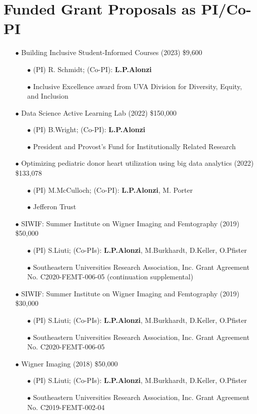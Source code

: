 \documentclass{article}[10pt]
\begin{document}
\section*{Funded Grant Proposals as PI/Co-PI}
\begin{itemize}
\item[$\bullet$] Building Inclusive Student-Informed Courses (2023) \$9,600
\begin{itemize}
\item[$\bullet$] (PI) R. Schmidt; (Co-PI): {\bf L.P.Alonzi}
\item[$\bullet$] Inclusive Excellence award from UVA Division for Diversity, Equity, and Inclusion
\end{itemize}
\item[$\bullet$] Data Science Active Learning Lab (2022) \$150,000
\begin{itemize}
\item[$\bullet$] (PI) B.Wright; (Co-PI): {\bf L.P.Alonzi}
\item[$\bullet$] President and Provost’s Fund for Institutionally Related Research
\end{itemize}
\item[$\bullet$] Optimizing pediatric donor heart utilization using big data analytics (2022) \$133,078
\begin{itemize}
\item[$\bullet$] (PI) M.McCulloch; (Co-PI): {\bf L.P.Alonzi}, M. Porter
\item[$\bullet$] Jefferon Trust
\end{itemize}
\item[$\bullet$] SIWIF: Summer Institute on Wigner Imaging and Femtography (2019) \$50,000
\begin{itemize}
\item[$\bullet$] (PI) S.Liuti; (Co-PIs): {\bf L.P.Alonzi}, M.Burkhardt, D.Keller, O.Pfister
\item[$\bullet$] Southeastern Universities Research Association, Inc. Grant Agreement No. C2020-FEMT-006-05 (continuation supplemental)
\end{itemize}
\item[$\bullet$] SIWIF: Summer Institute on Wigner Imaging and Femtography (2019) \$30,000
\begin{itemize}
\item[$\bullet$] (PI) S.Liuti; (Co-PIs): {\bf L.P.Alonzi}, M.Burkhardt, D.Keller, O.Pfister
\item[$\bullet$] Southeastern Universities Research Association, Inc. Grant Agreement No. C2020-FEMT-006-05
\end{itemize}
\end{itemize}\begin{itemize}
\item[$\bullet$] Wigner Imaging (2018) \$50,000
\begin{itemize}
\item[$\bullet$] (PI) S.Liuti; (Co-PIs): {\bf L.P.Alonzi}, M.Burkhardt, D.Keller, O.Pfister
\item[$\bullet$] Southeastern Universities Research Association, Inc. Grant Agreement No. C2019-FEMT-002-04
\end{itemize}
\end{itemize}
\end{document}
